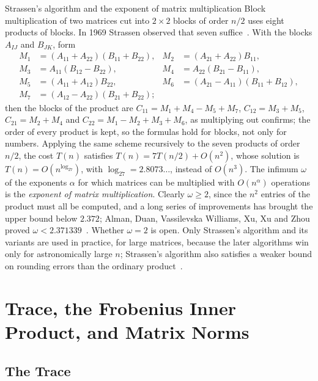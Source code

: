 \begin{note}{Strassen's algorithm and the exponent of matrix multiplication}
Block multiplication of two matrices cut into $2\times2$ blocks of order $n/2$ uses eight products of blocks. In 1969 Strassen observed that seven suffice~\cite{strassen1969}. With the blocks $A_{IJ}$ and $B_{JK}$, form
\[
\begin{aligned}
M_1&=(A_{11}+A_{22})(B_{11}+B_{22}),& M_2&=(A_{21}+A_{22})B_{11},\\
M_3&=A_{11}(B_{12}-B_{22}),& M_4&=A_{22}(B_{21}-B_{11}),\\
M_5&=(A_{11}+A_{12})B_{22},& M_6&=(A_{21}-A_{11})(B_{11}+B_{12}),\\
M_7&=(A_{12}-A_{22})(B_{21}+B_{22});&&
\end{aligned}
\]
then the blocks of the product are $C_{11}=M_1+M_4-M_5+M_7$, $C_{12}=M_3+M_5$, $C_{21}=M_2+M_4$ and $C_{22}=M_1-M_2+M_3+M_6$, as multiplying out confirms; the order of every product is kept, so the formulas hold for blocks, not only for numbers. Applying the same scheme recursively to the seven products of order $n/2$, the cost $T(n)$ satisfies $T(n)=7T(n/2)+O(n^2)$, whose solution is $T(n)=O(n^{\log_27})$, with $\log_27=2.8073\ldots$, instead of $O(n^3)$. The infimum $\omega$ of the exponents $\alpha$ for which matrices can be multiplied with $O(n^\alpha)$ operations is the \emph{exponent of matrix multiplication}. Clearly $\omega\ge2$, since the $n^2$ entries of the product must all be computed, and a long series of improvements has brought the upper bound below $2.372$; Alman, Duan, Vassilevska Williams, Xu, Xu and Zhou proved $\omega<2.371339$~\cite{alman2025}. Whether $\omega=2$ is open. Only Strassen's algorithm and its variants are used in practice, for large matrices, because the later algorithms win only for astronomically large $n$; Strassen's algorithm also satisfies a weaker bound on rounding errors than the ordinary product~\cite[Chap.~23]{higham2002accuracy}.
\end{note}

\section{Trace, the Frobenius Inner Product, and Matrix Norms}
\label{sec:trace-norms}

\subsection{The Trace}


